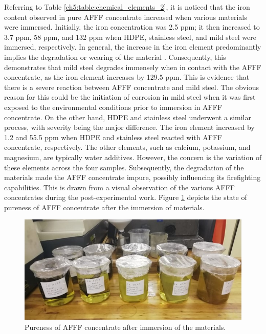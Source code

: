\documentclass[12pt]{report}
\begin{document}
Referring to Table \ref{ch5:table:chemical_elements_2}, it is noticed that the iron content observed in pure AFFF concentrate increased when various materials were immersed. Initially, the iron concentration was 2.5 ppm; it then increased to 3.7 ppm, 58 ppm, and 132 ppm when HDPE, stainless steel, and mild steel were immersed, respectively. In general, the increase in the iron element predominantly implies the degradation or wearing of the material \cite{mcarthur2004engineering}. Consequently, this demonstrates that mild steel degrades immensely when in contact with the AFFF concentrate, as the iron element increases by 129.5 ppm. This is evidence that there is a severe reaction between AFFF concentrate and mild steel. The obvious reason for this could be the initiation of corrosion in mild steel when it was first exposed to the environmental conditions prior to immersion in AFFF concentrate. On the other hand, HDPE and stainless steel underwent a similar process, with severity being the major difference. The iron element increased by 1.2 and 55.5 ppm when HDPE and stainless steel reacted with AFFF concentrate, respectively.
The other elements, such as calcium, potassium, and magnesium, are typically water additives. However, the concern is the variation of these elements across the four samples. Subsequently, the degradation of the materials made the AFFF concentrate impure, possibly influencing its firefighting capabilities. This is drawn from a visual observation of the various AFFF concentrates during the post-experimental work. Figure \ref{ch5:figure:pureness} depicts the state of pureness of AFFF concentrate after the immersion of materials.
 
\begin{figure}[H]
    \centering
    \includegraphics[width=\textwidth]{pureness_of_immersed_afff.jpg}
    \caption{Pureness of AFFF concentrate after immersion of the materials.}
    \label{ch5:figure:pureness}
\end{figure}
\end{document}
